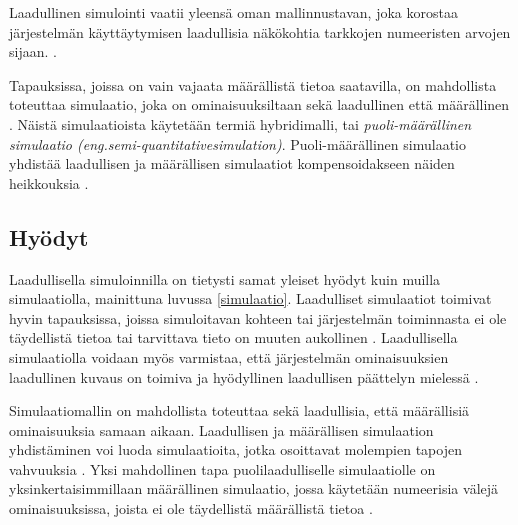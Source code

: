\documentclass[utf8]{gradu3}
\begin{document}
Laadullinen simulointi vaatii yleensä oman mallinnustavan, 
joka korostaa järjestelmän käyttäytymisen laadullisia näkökohtia 
tarkkojen numeeristen arvojen sijaan. 
%
\parencites%
  {parallelQualitativeSimulation1997}%
  {kuipers1986qualitative}%
\relax.
%

Tapauksissa, joissa on vain vajaata määrällistä tietoa saatavilla,
on mahdollista toteuttaa simulaatio, 
joka on ominaisuuksiltaan sekä laadullinen että määrällinen 
\parencite{semiHybrid1997qualitative}. 
Näistä simulaatioista käytetään termiä hybridimalli, tai
\textit{ puoli-määrällinen simulaatio 
(eng.semi-quantitativesimulation)}. 
Puoli-määrällinen simulaatio yhdistää laadullisen ja määrällisen simulaatiot
kompensoidakseen näiden heikkouksia \parencite{semiHybrid1997qualitative}.

\subsection{Hyödyt}
\begin{comment}
Hyödyt on aika yleinen otsikkoja toisaalta sisällöt ovat myös aika ylimalkaisia. Pystyykö tätä avaamaan paremmin. 

Jo määrällisessäkin simuloinnissa on usein tarve mm herkkyysanalyysille, jolla arvioidaan eri parametreissa olevien epävarmuuksien vaikutusta tulosmuuttujiin (ja joskus tämä on määrällisen simuloinnin tavoitekin). 
Vastaavasti tästä voi johtaa laadullisen tulosen sille, onko jonkin parametrin tai ilmiön tarkempi kuvaus tarpeen vai voiko rauhassa yksinkertaistaa.
\end{comment}
Laadullisella simuloinnilla on tietysti samat yleiset hyödyt kuin muilla simulaatiolla, mainittuna luvussa \ref{simulaatio}. Laadulliset simulaatiot toimivat hyvin tapauksissa, joissa simuloitavan kohteen tai järjestelmän toiminnasta ei ole täydellistä tietoa tai tarvittava tieto on muuten aukollinen \parencite{kuipers1986qualitative}. 
Laadullisella simulaatiolla voidaan myös varmistaa, että järjestelmän
ominaisuuksien laadullinen kuvaus on toimiva ja hyödyllinen 
laadullisen päättelyn mielessä \parencite{kuipers1986qualitative}.

Simulaatiomallin on mahdollista toteuttaa sekä laadullisia, 
että määrällisiä ominaisuuksia samaan aikaan. 
Laadullisen ja määrällisen simulaation yhdistäminen voi luoda simulaatioita, 
jotka osoittavat molempien tapojen vahvuuksia 
\parencite{semiHybrid1997qualitative}. 
Yksi mahdollinen tapa puolilaadulliselle simulaatiolle on yksinkertaisimmillaan
määrällinen simulaatio, jossa käytetään numeerisia välejä ominaisuuksissa, 
joista ei ole täydellistä määrällistä tietoa \parencite{semiHybrid1997qualitative}.
\end{document}
